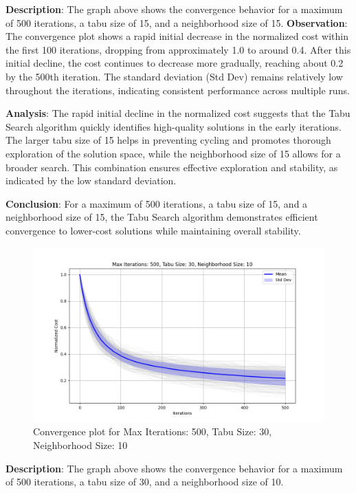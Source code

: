 \documentclass[
]{article}
\begin{document}
    \textbf{Description}: The graph above shows the convergence behavior for a maximum of 500 iterations, a tabu size of 15, and a neighborhood size of 15.
    \textbf{Observation}: The convergence plot shows a rapid initial decrease in the normalized cost within the first 100 iterations, dropping from approximately 1.0 to around 0.4. After this initial decline, the cost continues to decrease more gradually, reaching about 0.2 by the 500th iteration. The standard deviation (Std Dev) remains relatively low throughout the iterations, indicating consistent performance across multiple runs.

    \textbf{Analysis}: The rapid initial decline in the normalized cost suggests that the Tabu Search algorithm quickly identifies high-quality solutions in the early iterations. The larger tabu size of 15 helps in preventing cycling and promotes thorough exploration of the solution space, while the neighborhood size of 15 allows for a broader search. This combination ensures effective exploration and stability, as indicated by the low standard deviation.

    \textbf{Conclusion}: For a maximum of 500 iterations, a tabu size of 15, and a neighborhood size of 15, the Tabu Search algorithm demonstrates efficient convergence to lower-cost solutions while maintaining overall stability.


    \begin{figure}[H]
        \centering
        \includegraphics[width=\textwidth]{tabu_search/max_iter_500_tabu_size_30_neighborhood_size_10}
        \caption{Convergence plot for Max Iterations: 500, Tabu Size: 30, Neighborhood Size: 10}
        \label{fig:ts_500_30_10}
    \end{figure}

    \textbf{Description}: The graph above shows the convergence behavior for a maximum of 500 iterations, a tabu size of 30, and a neighborhood size of 10.
\end{document}
